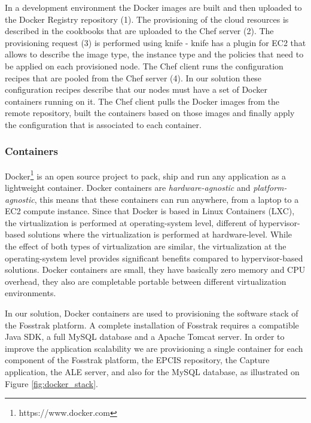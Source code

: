 In a development environment the Docker images are built and then uploaded to the Docker Registry
repository (1). The provisioning of the cloud resources is described in the cookbooks that are uploaded
to the Chef server (2). The provisioning request (3) is performed using knife - knife has a plugin for EC2
that allows to describe the image type, the instance type and the policies that need to be applied on
each provisioned node. The Chef client runs the configuration recipes that are pooled from the Chef server (4).
In our solution these configuration recipes describe that our nodes must have a set of Docker containers
running on it. The Chef client pulls the Docker images from the remote repository, built the
containers based on those images and finally apply the configuration that is associated to each container.

\subsubsection{Containers}
\label{subs:containers}
Docker\footnote{https://www.docker.com} is an open source project to pack, ship and run any application
as a lightweight container. Docker containers are \textit{hardware-agnostic} and \textit{platform-agnostic},
this means that these containers can run anywhere, from a laptop to a EC2 compute instance. Since that Docker
is based in Linux Containers (LXC), the virtualization is performed at operating-system level, different of
hypervisor-based solutions where the virtualization is performed at hardware-level. While the effect of both
types of virtualization are similar, the virtualization at the operating-system level provides significant
benefits compared to hypervisor-based solutions\cite{Merkel}. Docker containers are small, they have basically zero
memory and CPU overhead, they also are completable portable between different virtualization environments.

In our solution, Docker containers are used to provisioning the software stack of the Fosstrak platform.
A complete installation of Fosstrak requires a compatible Java SDK, a full MySQL database and
a Apache Tomcat server. In order to improve the application scalability we are provisioning a single container
for each component of the Fosstrak platform, the EPCIS repository, the Capture application, the ALE server,
and also for the MySQL database, as illustrated on Figure \ref{fig:docker_stack}.

